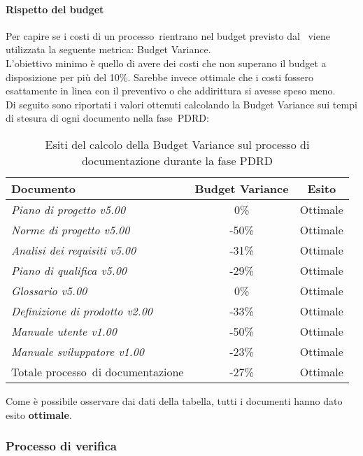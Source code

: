 \documentclass[../PianoDiQualifica.tex]{subfiles}
\begin{document}
\begin{appendices}
			\paragraph{Rispetto del budget}
			Per capire se i costi di un processo\g\ rientrano nel budget previsto dal \pianodiprogetto\ viene utilizzata la seguente metrica: Budget Variance.\\
			L'obiettivo minimo è quello di avere dei costi che non superano il budget a disposizione per più del 10\%. Sarebbe invece ottimale che i costi fossero esattamente in linea con il preventivo o che addirittura si avesse speso meno.\\
			Di seguito sono riportati i valori ottenuti calcolando la Budget Variance sui tempi di stesura di ogni documento nella fase\g\ PDRD:
			\begin{table}[H]
				\centering
				\begin{tabular}{l * {2}{c}}
					\toprule
					\textbf{Documento} & \textbf{Budget Variance} & \textbf{Esito} \\
					\midrule
					\textit{Piano di progetto v5.00} & 0\% &  Ottimale \\
					\textit{Norme di progetto v5.00} & -50\% & Ottimale \\
					\textit{Analisi dei requisiti v5.00} & -31\% & Ottimale \\
					\textit{Piano di qualifica v5.00} & -29\% & Ottimale \\
					\textit{Glossario v5.00} & 0\% & Ottimale \\
					\textit{Definizione di prodotto v2.00} & -33\% & Ottimale \\
					\textit{Manuale utente v1.00} & -50\% & Ottimale \\
					\textit{Manuale sviluppatore v1.00} & -23\% & Ottimale \\
					Totale processo\g\ di documentazione & -27\% & Ottimale \\
					\bottomrule
				\end{tabular}
				\caption{Esiti del calcolo della Budget Variance sul processo di documentazione durante la fase PDRD}
				\label{tab:esiti_budget_variance}
			\end{table}
			
			Come è possibile osservare dai dati della tabella, tutti i documenti hanno dato esito \textbf{ottimale}.
						
		\subsubsection{Processo di verifica}

\end{appendices}
\end{document}
